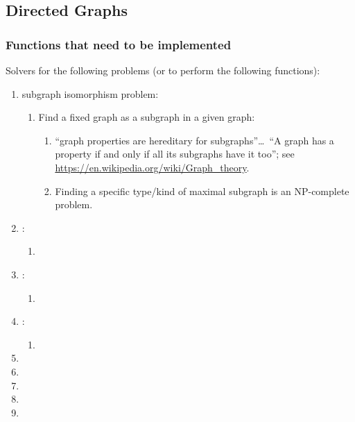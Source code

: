 \subsection{Directed Graphs}
\label{ssec:DirectedGraphs}



\subsubsection{Functions that need to be implemented}
\label{sssec:FunctionsThatNeedToBeImplemented}

Solvers for the following problems (or to perform the following functions): \vspace{-0.3cm}
\begin{enumerate} \itemsep -4pt
\item subgraph isomorphism problem: \vspace{-0.3cm}
	\begin{enumerate} \itemsep -2pt
	\item Find a fixed graph as a subgraph in a given graph: \vspace{-0.2cm}
		\begin{enumerate} \itemsep -2pt
		\item ``graph properties are hereditary for subgraphs''\dots\ ``A graph has a property if and only if all its subgraphs have it too''; see \url{https://en.wikipedia.org/wiki/Graph_theory}.
		\item Finding a specific type/kind of maximal subgraph is an NP-complete problem.
		\end{enumerate}
	\end{enumerate}
\item : \vspace{-0.3cm}
	\begin{enumerate} \itemsep -2pt
	\item 
	\end{enumerate}
\item : \vspace{-0.3cm}
	\begin{enumerate} \itemsep -2pt
	\item 
	\end{enumerate}
\item : \vspace{-0.3cm}
	\begin{enumerate} \itemsep -2pt
	\item 
	\end{enumerate}
\item 
\item 
\item 
\item 
\item 
\end{enumerate}



